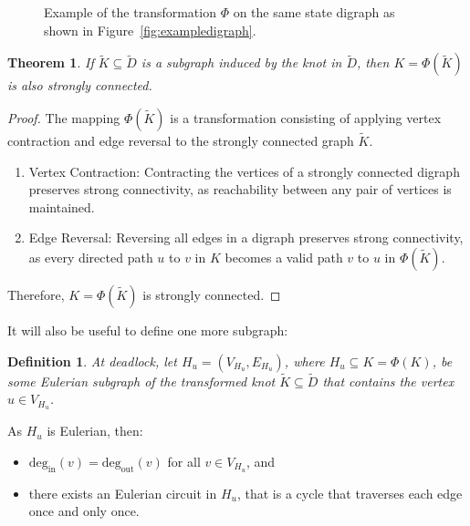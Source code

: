 \documentclass{article}
\newtheorem{definition}{Definition}
\newtheorem{theorem}{Theorem}
\begin{document}
\begin{figure}
\begin{center}

\end{center}
\caption{Example of the transformation $\Phi$ on the same state digraph as shown
in Figure~\ref{fig:exampledigraph}.}
\label{fig:transformation_example}
\end{figure}

\begin{theorem}
If $\tilde{K} \subseteq \tilde{D}$ is a subgraph induced by the knot in
$\tilde{D}$, then $K = \Phi(\tilde{K})$ is also strongly connected.
\end{theorem}

\begin{proof}
The mapping $\Phi(\tilde{K})$ is a transformation consisting of applying vertex
contraction and edge reversal to the strongly connected graph $\tilde{K}$.

\begin{enumerate}
    \item Vertex Contraction: Contracting the vertices of a strongly connected
    digraph preserves strong connectivity, as reachability between any pair of
    vertices is maintained.
    \item Edge Reversal: Reversing all edges in a digraph preserves strong
    connectivity, as every directed path $u$ to $v$ in $K$ becomes a valid path
    $v$ to $u$ in $\Phi(\tilde{K})$.
\end{enumerate}

Therefore, $K = \Phi(\tilde{K})$ is strongly connected.
\end{proof}

It will also be useful to define one more subgraph:

\begin{definition}\label{def:Hu}
At deadlock, let $H_u = (V_{H_u}, E_{H_u})$, where $H_u \subseteq K = \Phi(K)$,
be some Eulerian subgraph of the transformed knot $\tilde{K} \subseteq \tilde{D}$
that contains the vertex $u \in V_{H_u}$.
\end{definition}

As $H_u$ is Eulerian, then:
\begin{itemize}
  \item $\text{deg}_{\text{in}}(v) = \text{deg}_{\text{out}}(v)$ for all
  $v \in V_{H_u}$, and
  \item there exists an Eulerian circuit in $H_u$, that is a cycle that
  traverses each edge once and only once.
\end{itemize}
\end{document}
